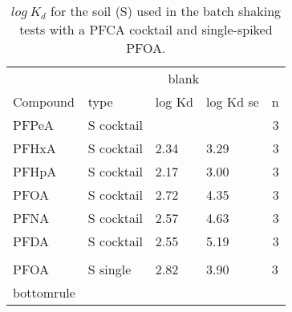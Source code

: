 \begin{table}[ht]
\caption{$log~K_d$ for the soil (S) used in the batch shaking tests with a PFCA cocktail and single-spiked PFOA.}
\centering
\label{apptab:soil_Kd}
\begin{tabular}{llllr} \toprule
         & \multicolumn{4}{c}{blank}                                \\ \cline{2-5} 
Compound & type        & log Kd & log Kd se & \multicolumn{1}{l}{n} \\ \midrule
PFPeA    & S cocktail &        &           & 3                     \\
PFHxA    & S cocktail & 2.34   & 3.29      & 3                     \\
PFHpA    & S cocktail & 2.17   & 3.00      & 3                     \\
PFOA     & S cocktail & 2.72   & 4.35      & 3                     \\
PFNA     & S cocktail & 2.57   & 4.63      & 3                     \\
PFDA     & S cocktail & 2.55   & 5.19      & 3                     \\
         &             &        &           & \multicolumn{1}{l}{}  \\
PFOA     & S single    & 2.82   & 3.90      & \multicolumn{1}{l}{3} \\ bottomrule
\end{tabular}
\end{table}